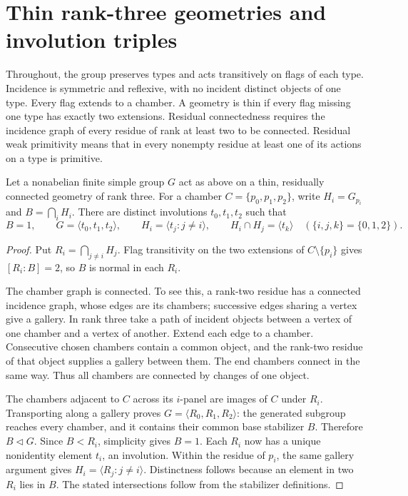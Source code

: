 \section{Thin rank-three geometries and involution triples}
Throughout, the group preserves types and acts transitively on flags of
each type. Incidence is symmetric and reflexive, with no incident distinct
objects of one type. Every flag extends to a chamber. A geometry is thin
if every flag missing one type has exactly two extensions. Residual
connectedness requires the incidence graph of every residue of rank at
least two to be connected. Residual weak primitivity means that in every
nonempty residue at least one of its actions on a type is primitive.

\begin{lemma}\label{thin-triples}
Let a nonabelian finite simple group $G$ act as above on a thin, residually
connected geometry of rank three. For a chamber $C=\{p_0,p_1,p_2\}$,
write $H_i=G_{p_i}$ and $B=\bigcap_i H_i$. There are distinct involutions
$t_0,t_1,t_2$ such that
\[
 B=1,\qquad G=\langle t_0,t_1,t_2\rangle,\qquad
 H_i=\langle t_j:j\ne i\rangle,
 \qquad H_i\cap H_j=\langle t_k\rangle\quad(\{i,j,k\}=\{0,1,2\}).
\]
\end{lemma}
\begin{proof}
Put $R_i=\bigcap_{j\ne i}H_j$. Flag transitivity on the two extensions
of $C\setminus\{p_i\}$ gives $[R_i:B]=2$, so $B$ is normal in each $R_i$.

The chamber graph is connected. To see this, a rank-two residue has a
connected incidence graph, whose edges are its chambers; successive edges
sharing a vertex give a gallery. In rank three take a path of incident
objects between a vertex of one chamber and a vertex of another. Extend
each edge to a chamber. Consecutive chosen chambers contain a common
object, and the rank-two residue of that object supplies a gallery between
them. The end chambers connect in the same way. Thus all chambers are
connected by changes of one object.

The chambers adjacent to $C$ across its $i$-panel are images of $C$ under
$R_i$. Transporting along a gallery proves
$G=\langle R_0,R_1,R_2\rangle$: the generated subgroup reaches every
chamber, and it contains their common base stabilizer $B$. Therefore
$B\lhd G$. Since $B<R_i$, simplicity gives $B=1$. Each $R_i$ now has a
unique nonidentity element $t_i$, an involution. Within the residue of
$p_i$, the same gallery argument gives
$H_i=\langle R_j:j\ne i\rangle$. Distinctness follows because an element
in two $R_i$ lies in $B$. The stated intersections follow from the
stabilizer definitions.
\end{proof}

